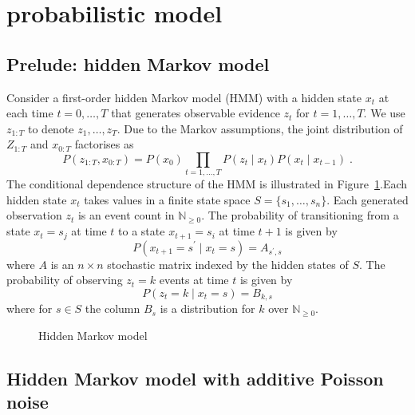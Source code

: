 \documentclass[twoside, 11pt]{article}
\newcommand{\nonnegint}[0] {\mathbb{N}_{\geq 0}}
\begin{document}
\section{probabilistic model}
\subsection{Prelude: hidden Markov model}

Consider a first-order hidden Markov model (HMM) with a hidden state $x_t$ at each time $t=0,\ldots,T$ that generates observable evidence $z_t$ for $t=1,\ldots,T$. We use $z_{1:T}$ to denote $z_1, \ldots, z_T$. Due to the Markov assumptions, the joint distribution of $Z_{1:T}$ and $x_{0:T}$ factorises as
\begin{equation}
P(z_{1:T}, x_{0:T}) = P(x_0) \prod_{t=1, \ldots, T} P(z_t \mid x_t) P(x_t \mid x_{t-1} ) \; .
\end{equation}
The conditional dependence structure of the HMM is illustrated in Figure~\ref{fig:hmm}.Each hidden state $x_t$ takes values in a finite state space $S = \{ s_1, \ldots, s_n \}$. Each generated observation $z_t$ is an event count in $\nonnegint$. The probability of transitioning from a state $x_t=s_j$ at time $t$ to a state $x_{t+1}=s_i$ at time $t+1$ is given by
\begin{equation}
P(x_{t+1}=s^{\prime} \mid x_t=s) = A_{s^{\prime},s}
\end{equation}
where $A$ is an $n \times n$ stochastic matrix indexed by the hidden states of $S$. The probability of observing $z_t=k$ events at time $t$ is given by
\begin{equation}
P(z_t=k \mid x_t=s) = B_{k, s}
\end{equation}
where for $s \in S$ the column $B_s$ is a distribution for $k$ over $\nonnegint$.


\begin{figure}[H]
\caption{Hidden Markov model}
\label{fig:hmm}
\end{figure}

\subsection{Hidden Markov model with additive Poisson noise}
\end{document}
